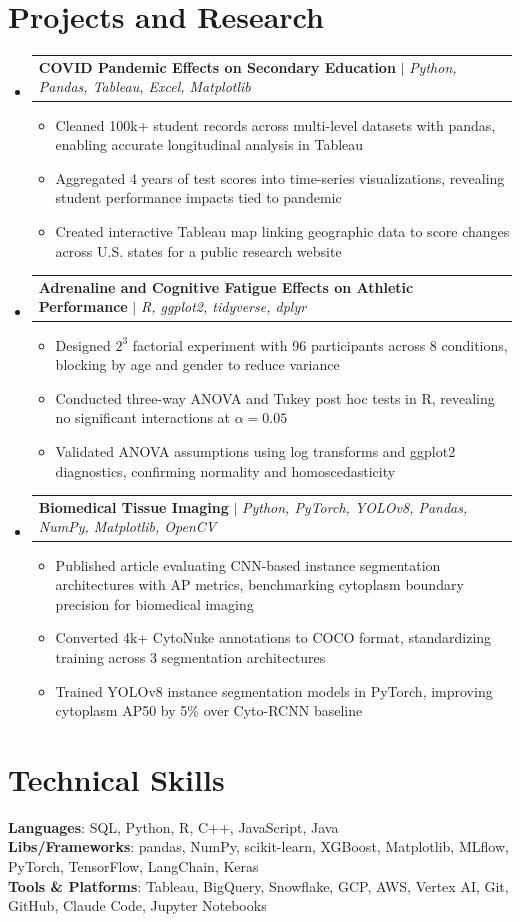 \documentclass[letterpaper,11pt]{article}
\makeatletter
\newcommand{\resumeItem}[1]{
  \item\small{#1}
}
\newcommand{\resumeProjectHeading}[2]{
    \item
    \begin{tabular*}{\textwidth}{l@{\extracolsep{\fill}}r}
      #1 & #2 \\
    \end{tabular*}\vspace{-7pt}
}
\newcommand{\resumeSubHeadingListStart}{\begin{itemize}[leftmargin=0in, label={}]}
\newcommand{\resumeSubHeadingListEnd}{\end{itemize}}
\newcommand{\resumeItemListStart}{\begin{itemize}[itemsep= 1.5pt, parsep=0pt]}
\newcommand{\resumeItemListEnd}{\end{itemize}\vspace{-5pt}}
\makeatother
\begin{document}
\section{Projects and Research}
    \resumeSubHeadingListStart
      \resumeProjectHeading
          {\textbf{COVID Pandemic Effects on Secondary Education} $|$ \textit{Python, Pandas, Tableau, Excel, Matplotlib}}{}
          \resumeItemListStart
            \resumeItem{Cleaned 100k+ student records across multi-level datasets with pandas, enabling accurate longitudinal analysis in Tableau}
            \resumeItem{Aggregated 4 years of test scores into time-series visualizations, revealing student performance impacts tied to pandemic}
            \resumeItem{Created interactive Tableau map linking geographic data to score changes across U.S. states for a public research website}
          \resumeItemListEnd
      \resumeProjectHeading
          {\textbf{Adrenaline and Cognitive Fatigue Effects on Athletic Performance} $|$ \textit{R, ggplot2, tidyverse, dplyr}}{}
          \resumeItemListStart
            \resumeItem{Designed $2^3$ factorial experiment with 96 participants across 8 conditions, blocking by age and gender to reduce variance}
            \resumeItem{Conducted three-way ANOVA and Tukey post hoc tests in R, revealing no significant interactions at $\alpha = 0.05$}
            \resumeItem{Validated ANOVA assumptions using log transforms and ggplot2 diagnostics, confirming normality and homoscedasticity}
          \resumeItemListEnd
      \resumeProjectHeading
          {\textbf{Biomedical Tissue Imaging} $|$ \textit{Python, PyTorch, YOLOv8, Pandas, NumPy, Matplotlib, OpenCV}}{}
          \resumeItemListStart
            \resumeItem{Published article evaluating CNN-based instance segmentation architectures with AP metrics, benchmarking cytoplasm boundary precision for biomedical imaging}
            \resumeItem{Converted 4k+ CytoNuke annotations to COCO format, standardizing training across 3 segmentation architectures}
            \resumeItem{Trained YOLOv8 instance segmentation models in PyTorch, improving cytoplasm AP50 by 5\% over Cyto-RCNN baseline}
          \resumeItemListEnd
    \resumeSubHeadingListEnd
\section{Technical Skills}
 \begin{itemize}[leftmargin=0in, label={}]
    \small{\item{
     \textbf{Languages}{: SQL, Python, R, C++, JavaScript, Java} \\
     \textbf{Libs/Frameworks}{: pandas, NumPy, scikit-learn, XGBoost, Matplotlib, MLflow, PyTorch, TensorFlow, LangChain, Keras} \\
     \textbf{Tools \& Platforms}{: Tableau, BigQuery, Snowflake, GCP, AWS, Vertex AI, Git, GitHub, Claude Code, Jupyter Notebooks}
    }}
 \end{itemize}
\end{document}
